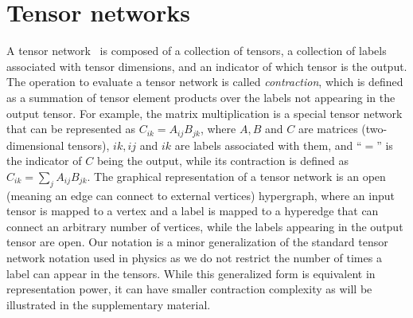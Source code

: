 \documentclass[onefignum, onetabnum]{siamart190516}
\newcommand{\<}{\langle}
\renewcommand{\>}{\rangle}
\newcommand{\App}[1]{Appendix~\ref{#1}}
\newcounter{example}
\begin{document}
\section{Tensor networks}\label{sec:tn}
A tensor network~\cite{Cirac2021, Orus2014} is composed of a collection of tensors, a collection of labels associated with tensor dimensions, and an indicator of which tensor is the output.
The operation to evaluate a tensor network is called \textit{contraction}, which is defined as a summation of tensor element products over the labels not appearing in the output tensor.
For example, the matrix multiplication is a special tensor network that can be represented as $C_{ik} = A_{ij}B_{jk}$, where $A, B$ and $C$ are matrices (two-dimensional tensors), $ik,ij$ and $ik$ are labels associated with them, and ``$=$'' is the indicator of $C$ being the output, while its contraction is defined as $C_{ik} = \sum_j A_{ij}B_{jk}$.
The graphical representation of a tensor network is an open (meaning an edge can connect to external vertices) hypergraph, where an input tensor is mapped to a vertex and a label is mapped to a hyperedge that can connect an arbitrary number of vertices, while the labels appearing in the output tensor are open.
Our notation is a minor generalization of the standard tensor network notation used in physics as we do not restrict the number of times a label can appear in the tensors. 
While this generalized form is equivalent in representation power, it can have smaller contraction complexity as will be illustrated in the supplementary material.
\end{document}
